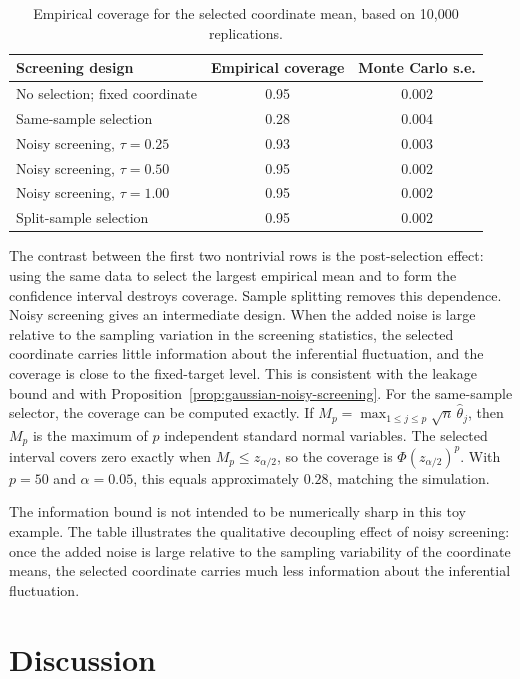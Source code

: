 \documentclass[11pt]{article}
\begin{document}
\begin{table}[h]
	\centering
	\caption{Empirical coverage for the selected coordinate mean, based on 10,000 replications.}
	\label{tab:illustration}
	\begin{tabular}{lcc}
		\hline
		Screening design & Empirical coverage & Monte Carlo s.e. \\
		\hline
		No selection; fixed coordinate & 0.95 & 0.002 \\
		Same-sample selection & 0.28 & 0.004 \\
		Noisy screening, $\tau = 0.25$ & 0.93 & 0.003 \\
		Noisy screening, $\tau = 0.50$ & 0.95 & 0.002 \\
		Noisy screening, $\tau = 1.00$ & 0.95 & 0.002 \\
		Split-sample selection & 0.95 & 0.002 \\
		\hline
	\end{tabular}
\end{table}


The contrast between the first two nontrivial rows is the post-selection effect: using the same data to select the largest empirical mean and to form the confidence interval destroys coverage. Sample splitting removes this dependence. Noisy screening gives an intermediate design. When the added noise is large relative to the sampling variation in the screening statistics, the selected coordinate carries little information about the inferential fluctuation, and the coverage is close to the fixed-target level. This is consistent with the leakage bound and with Proposition~\ref{prop:gaussian-noisy-screening}.  For the same-sample selector, the coverage can be computed exactly. If \(M_p=\max_{1\leq j\leq p}\sqrt n\,\widehat\theta_j\), then \(M_p\) is the maximum of \(p\) independent standard normal variables. The selected interval covers zero exactly when \(M_p\leq z_{\alpha/2}\), so the coverage is \(
\Phi(z_{\alpha/2})^p.\) With \(p=50\) and \(\alpha=0.05\), this equals approximately \(0.28\), matching the simulation.

The information bound is not intended to be numerically sharp in this toy
example. The table illustrates the qualitative decoupling effect of noisy
screening: once the added noise is large relative to the sampling variability of the coordinate means, the selected coordinate carries much less information about the inferential fluctuation.

\section{Discussion}
\label{sec:discussion}
\end{document}
